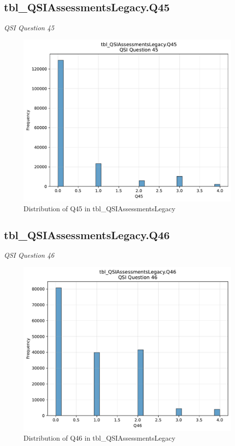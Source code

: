 \subsection{tbl\_QSIAssessmentsLegacy.Q45}
\textit{QSI Question 45}

\begin{figure}[htbp]
\centering
\includegraphics[width=\textwidth]{figures/dbo_tbl_QSIAssessmentsLegacy_Q45.pdf}
\caption{Distribution of Q45 in tbl\_QSIAssessmentsLegacy}
\end{figure}\newpage

\subsection{tbl\_QSIAssessmentsLegacy.Q46}
\textit{QSI Question 46}

\begin{figure}[htbp]
\centering
\includegraphics[width=\textwidth]{figures/dbo_tbl_QSIAssessmentsLegacy_Q46.pdf}
\caption{Distribution of Q46 in tbl\_QSIAssessmentsLegacy}
\end{figure}\newpage

